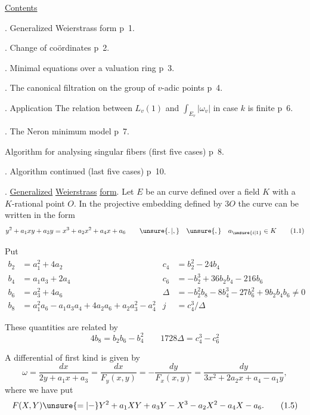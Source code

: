 \begin{center}\uline{Contents}\end{center}

. Generalized Weierstrass form \qquad p~1.

. Change of coördinates \qquad p~2.

. Minimal  equations over a valuation ring \qquad p~3.

. The canonical filtration on the group of $v$-adic points \qquad p~4.

. Application The relation between $L_v(1)$ and $\int_{E_v}|\omega_v|$ in case $k$ is finite \qquad p~6.

. The Neron minimum model \qquad p~7.

 Algorithm for analysing singular fibers \quad (first five cases) \qquad p~8.

. Algorithm continued \quad (last five cases) \qquad p~10.

\begingroup
\makeatletter\tagsleft@true{}. \uline{Generalized} \uline{Weierstrass} \uline{form}. Let $E$ be an  curve defined over a field \unsure{-} $K$ with a $K$-rational point $O$. In the projective embedding defined by $3O$ the curve can be written in the form
\[
y^2+a_1xy+a_3y=x^3+a_2x^2+a_4x+a_6
\qquad \unsure{\ldotp|,}\quad\unsure{,}\quad a_{\unsure{i|1}}\in K
\tag*{(1.1)}
\]

Put
\[
\begin{aligned}
 b_2&=a_1^2+4a_2                  & c_4&=b_2^2-24b_4\\
 b_4&=a_1a_3+2a_4                  & c_6&=-b_2^3+36b_2b_4-216b_6\\
 b_6&=a_3^2+4a_6                    & \Delta&=-b_2^2b_8-8b_4^3-27b_6^2+9b_2b_4b_6\ne0\\
 b_8&=a_1^2a_6-a_1a_3a_4+4a_2a_6+a_2a_3^2-a_4^2
                                      & j&=c_4^3/\Delta
\end{aligned}
\tag*{(1.2)}
\]

These quantities are related by
\[
4b_8=b_2b_6-b_4^2 \qquad 1728\Delta=c_4^3-c_6^2
\tag*{(1.3)}
\]

A differential of first kind is given by
\[
\omega=\frac{dx}{2y+a_1x+a_3}
=\frac{dx}{F_y(x,y)}=-\frac{dy}{F_x(x,y)}
=\frac{dy}{3x^2+2a_2x+a_4-a_1y},
\tag*{(1.4)}
\]
where we have put
\[
F(X,Y)\unsure{=|-}Y^2+a_1XY+a_3Y-X^3-a_2X^2-a_4X-a_6.
\tag*{(1.5)}
\]

